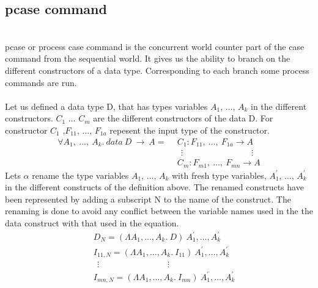 \documentclass[11pt]{article}
\begin{document}
\subsection {pcase command}
~~\\
{\sf pcase} or {\sf process case} command is the concurrent world counter part of the case command from the sequential world. It gives us the ability to branch on the different constructors of a data type. Corresponding to each branch some process commands are run.
~~\\~~\\
Let us defined a data type D, that has types variables $A_1$, $\ldots$, $A_k$ in the different constructors. $C_1$ $\ldots$ $C_m$ are the different constructors of the data D.
For constructor $C_1$ ,$F_{11}$, $\ldots$, $F_{1a}$ repesent the input type of the constructor. 
\begin{align*} 
\forall A_1,~ \ldots,~A_k.~data~ D ~\to~ A =
 & ~~ C_1 : F_{11},~ \ldots, ~ F_{1a} \to A \\
 & ~~~~ \vdots \qquad\qquad \qquad\qquad \vdots \\ 
 & ~~ C_m : F_{m1} ,~ \ldots, ~ F_{mn} \to A
\end{align*}
Lets $\alpha$ rename the type variables $A_1$, $\ldots$, $A_k$ with fresh type variables, $A_1^{\prime}$, $\ldots$, $A_k^{\prime}$   in the different constructs of the definition above. The renamed constructs have been represented by adding a subscript N to the name of the construct. The renaming is done to avoid any conflict between the variable names used in the the data construct with that used in the equation. 
\begin{align*} 
 & ~~ D_N = (\Lambda A_1,\ldots,A_k.~D)~A_1^{\prime},\ldots,A_k^{\prime} \\
 & ~~ I_{11,N} = (\Lambda A_1,\ldots,A_k.~ I_{11})~A_1^{\prime},\ldots,A_k^{\prime} \\
 & ~~~~ \vdots \qquad\qquad \qquad\qquad \vdots \\ 
 & ~~ I_{mn,N} = (\Lambda A_1,\ldots,A_k.~ I_{mn})~A_1^{\prime},\ldots,A_k^{\prime} \\
\end{align*}
\end{document}
